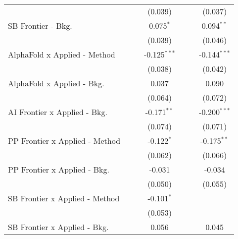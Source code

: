 \begin{tabular}{lcccccc}
                                  &               &              & (0.039)        &               &              & (0.037)\\   
   SB Frontier - Bkg.             &               &              & 0.075$^{*}$    &               &              & 0.094$^{**}$\\   
                                  &               &              & (0.039)        &               &              & (0.046)\\   
   AlphaFold x Applied - Method   &               &              & -0.125$^{***}$ &               &              & -0.144$^{***}$\\   
                                  &               &              & (0.038)        &               &              & (0.042)\\   
   AlphaFold x Applied - Bkg.     &               &              & 0.037          &               &              & 0.090\\   
                                  &               &              & (0.064)        &               &              & (0.072)\\   
   AI Frontier x Applied - Bkg.   &               &              & -0.171$^{**}$  &               &              & -0.200$^{***}$\\   
                                  &               &              & (0.074)        &               &              & (0.071)\\   
   PP Frontier x Applied - Method &               &              & -0.122$^{*}$   &               &              & -0.175$^{**}$\\   
                                  &               &              & (0.062)        &               &              & (0.066)\\   
   PP Frontier x Applied - Bkg.   &               &              & -0.031         &               &              & -0.034\\   
                                  &               &              & (0.050)        &               &              & (0.055)\\   
   SB Frontier x Applied - Method &               &              & -0.101$^{*}$   &               &              &   \\   
                                  &               &              & (0.053)        &               &              &   \\   
   SB Frontier x Applied - Bkg.   &               &              & 0.056          &               &              & 0.045\\   

\end{tabular}
